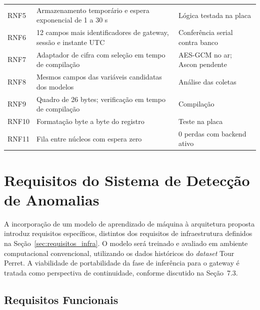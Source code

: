\begin{table}[htb]
\begin{tabular}{lp{}p{}}
RNF5 & Armazenamento temporário e espera exponencial de 1 a 30 s & Lógica testada na placa \\
RNF6 & 12 campos mais identificadores de gateway, sessão e instante UTC & Conferência serial contra banco \\
RNF7 & Adaptador de cifra com seleção em tempo de compilação & AES-GCM no ar; Ascon pendente \\
RNF8 & Mesmos campos das variáveis candidatas dos modelos & Análise das coletas \\
RNF9 & Quadro de 26 bytes; verificação em tempo de compilação & Compilação \\
RNF10 & Formatação byte a byte do registro & Teste na placa \\
RNF11 & Fila entre núcleos com espera zero & 0 perdas com backend ativo \\
\hline
\end{tabular}
\end{table}



\section{Requisitos do Sistema de Detecção de Anomalias}
A incorporação de um modelo de aprendizado de máquina à arquitetura proposta 
introduz requisitos específicos, distintos dos requisitos de infraestrutura 
definidos na Seção~\ref{sec:requisitos_infra}. O modelo será treinado e 
avaliado em ambiente computacional convencional, utilizando os dados 
históricos do \textit{dataset} Tour Perret. A viabilidade de portabilidade 
da fase de inferência para o gateway é tratada como perspectiva de 
continuidade, conforme discutido na Seção~7.3.


\subsection{Requisitos Funcionais}

